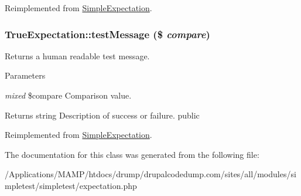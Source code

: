 Reimplemented from \hyperlink{class_simple_expectation_aa2b98f827e7487ebe12cedb9ad39d061}{SimpleExpectation}.\hypertarget{class_true_expectation_acf35201c91abb8313f31b7f1690ca3c8}{
\subsubsection[{testMessage}]{\setlength{\rightskip}{0pt plus 5cm}TrueExpectation::testMessage (\$ {\em compare})}}
\label{class_true_expectation_acf35201c91abb8313f31b7f1690ca3c8}
Returns a human readable test message. 
\begin{DoxyParams}{Parameters}
\item[{\em mixed}]\$compare Comparison value. \end{DoxyParams}
\begin{DoxyReturn}{Returns}
string Description of success or failure.  public 
\end{DoxyReturn}


Reimplemented from \hyperlink{class_simple_expectation_a15b69edf659c76f6543aa98d8d85b025}{SimpleExpectation}.

The documentation for this class was generated from the following file:\begin{DoxyCompactItemize}
\item 
/Applications/MAMP/htdocs/drump/drupalcodedump.com/sites/all/modules/simpletest/simpletest/expectation.php\end{DoxyCompactItemize}
